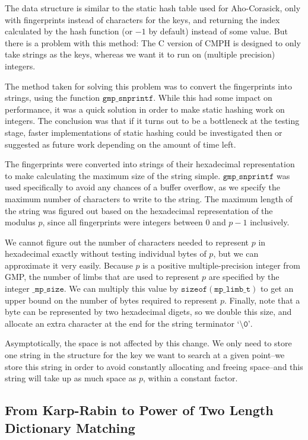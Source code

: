 \documentclass[ %
                    author={Dominic Joseph Moylett},
                    degree={MEng},
                     title={Dictionary Matching with Fingerprints},
                  subtitle={An Empirical Analysis},
                      type={Research},
                      year={2014} ]{dissertation}
\begin{document}
The data structure is similar to the static hash table used for Aho-Corasick, only with fingerprints instead of characters for the keys, and returning the index calculated by the hash function (or $-1$ by default) instead of some value. But there is a problem with this method: The C version of CMPH is designed to only take strings as the keys, whereas we want it to run on (multiple precision) integers.

The method taken for solving this problem was to convert the fingerprints into strings, using the function $\texttt{gmp\_snprintf}$. While this had some impact on performance, it was a quick solution in order to make static hashing work on integers. The conclusion was that if it turns out to be a bottleneck at the testing stage, faster implementations of static hashing could be investigated then or suggested as future work depending on the amount of time left.

The fingerprints were converted into strings of their hexadecimal representation to make calculating the maximum size of the string simple. $\texttt{gmp\_snprintf}$ was used specifically to avoid any chances of a buffer overflow, as we specify the maximum number of characters to write to the string. The maximum length of the string was figured out based on the hexadecimal representation of the modulus $p$, since all fingerprints were integers between 0 and $p - 1$ inclusively.

We cannot figure out the number of characters needed to represent $p$ in hexadecimal exactly without testing individual bytes of $p$, but we can approximate it very easily. Because $p$ is a positive multiple-precision integer from GMP, the number of limbs that are used to represent $p$ are specified by the integer $\texttt{\_mp\_size}$. We can multiply this value by $\texttt{sizeof}(\texttt{mp\_limb\_t})$ to get an upper bound on the number of bytes required to represent $p$. Finally, note that a byte can be represented by two hexadecimal digets, so we double this size, and allocate an extra character at the end for the string terminator $\texttt{`\textbackslash0'}$.

Asymptotically, the space is not affected by this change. We only need to store one string in the structure for the key we want to search at a given point--we store this string in order to avoid constantly allocating and freeing space--and this string will take up as much space as $p$, within a constant factor.

\subsection{From Karp-Rabin to Power of Two Length Dictionary Matching}
\end{document}

